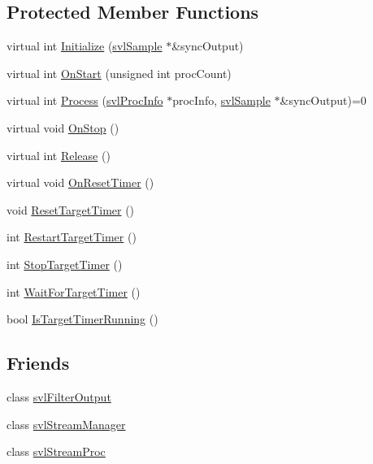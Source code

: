 \subsection*{Protected Member Functions}
\begin{DoxyCompactItemize}
\item 
virtual int \hyperlink{classsvl_filter_source_base_a7fea7ec5ddd6eb315f482fce965e2cc9}{Initialize} (\hyperlink{classsvl_sample}{svl\-Sample} $\ast$\&sync\-Output)
\item 
virtual int \hyperlink{classsvl_filter_source_base_a3b829c812d5a24d99068c0f56b632d11}{On\-Start} (unsigned int proc\-Count)
\item 
virtual int \hyperlink{classsvl_filter_source_base_a6d50fd7ef217d1d760c76e325169ecaf}{Process} (\hyperlink{structsvl_proc_info}{svl\-Proc\-Info} $\ast$proc\-Info, \hyperlink{classsvl_sample}{svl\-Sample} $\ast$\&sync\-Output)=0
\item 
virtual void \hyperlink{classsvl_filter_source_base_a62b3a81c6ee6db846616726ecc34a902}{On\-Stop} ()
\item 
virtual int \hyperlink{classsvl_filter_source_base_a358d2a26ad00dad3f7a4a6aa965f9032}{Release} ()
\item 
virtual void \hyperlink{classsvl_filter_source_base_a2a103fefe9d4e53c50be43a7f39c2120}{On\-Reset\-Timer} ()
\item 
void \hyperlink{classsvl_filter_source_base_ad6037ac4e48119108118f267f158d853}{Reset\-Target\-Timer} ()
\item 
int \hyperlink{classsvl_filter_source_base_a944e2b8830459bad150018518a780d1b}{Restart\-Target\-Timer} ()
\item 
int \hyperlink{classsvl_filter_source_base_ae744047eaaaa2ece40651a000044811c}{Stop\-Target\-Timer} ()
\item 
int \hyperlink{classsvl_filter_source_base_a8282cf8b67c209b025ab956a8269cb61}{Wait\-For\-Target\-Timer} ()
\item 
bool \hyperlink{classsvl_filter_source_base_aaae4e6e333924cee086e1ebc9a85de21}{Is\-Target\-Timer\-Running} ()
\end{DoxyCompactItemize}
\subsection*{Friends}
\begin{DoxyCompactItemize}
\item 
class \hyperlink{classsvl_filter_source_base_a3f45c3511fc124d190c8ffb5953025f6}{svl\-Filter\-Output}
\item 
class \hyperlink{classsvl_filter_source_base_ab5eee58544f2ce644140e932afbe32db}{svl\-Stream\-Manager}
\item 
class \hyperlink{classsvl_filter_source_base_a6a9ee1dec5ca263793dca09411295245}{svl\-Stream\-Proc}
\end{DoxyCompactItemize}
